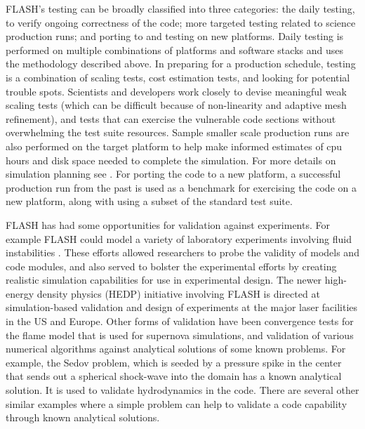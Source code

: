 FLASH's testing can be broadly classified into
three categories: the daily testing, to verify
ongoing correctness of the code; more targeted testing  related to
science production runs; and porting to and testing on new
platforms. Daily testing is performed on multiple combinations of
platforms and software stacks and uses the methodology described above. In preparing for a  production
schedule, testing is a combination of 
scaling tests, cost estimation tests, and looking for potential
trouble spots. Scientists and developers work closely to devise
meaningful weak scaling tests (which can be difficult because of
non-linearity and adaptive mesh refinement), and tests that can 
exercise the vulnerable code sections without overwhelming the test
suite resources. Sample smaller scale production runs are also
performed on the target platform to help make informed estimates of cpu
hours and disk space needed to complete the simulation. For more
details on simulation planning see \cite{Dubey2013}. For porting the
code to a new platform, a successful production run from the past is used as a
benchmark for exercising the code on a new platform, along with using
a subset of the standard test suite.

FLASH has had some opportunities for validation against
experiments. For example FLASH could model a variety of laboratory
experiments involving fluid instabilities
\cite{Dimonte2004,Kane2001}. These efforts allowed researchers to
probe the validity of models and code modules, and also served to
bolster the experimental efforts by creating realistic simulation
capabilities for use in experimental design. The newer high-energy
density physics (HEDP) initiative involving FLASH  
is directed at simulation-based validation and design of
experiments at the major laser facilities in the US and
Europe. Other forms of validation have been convergence tests for the
flame model that is used for supernova simulations, and validation of
various numerical algorithms against analytical solutions of some
known problems. For example, the Sedov \cite{sedov} problem, which is
seeded by a pressure spike in the center that sends out a spherical
shock-wave into the domain has a known analytical solution. It is used
to validate hydrodynamics in the code. There are several other similar
examples where a simple problem can help to validate a code capability
through known analytical solutions. 

